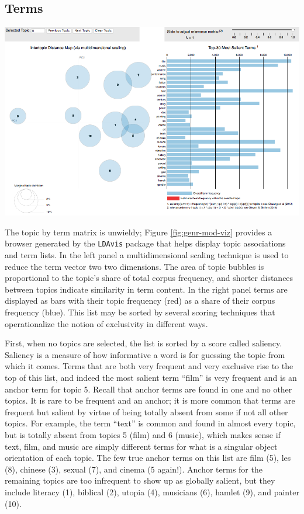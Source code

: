 \documentclass[]{book}
\theoremstyle{definition}
\theoremstyle{definition}
\theoremstyle{definition}
\theoremstyle{remark}
\begin{document}
\hypertarget{terms}{%
\subsection{Terms}\label{terms}}

\begin{center}\includegraphics[width=0.9\linewidth]{img/genr-mod-viz} \end{center}

The topic by term matrix is unwieldy; Figure \ref{fig:genr-mod-viz}
provides a browser generated by the \texttt{LDAvis} package that helps
display topic associations and term lists. In the left panel a
multidimensional scaling technique is used to reduce the term vector two
two dimensions. The area of topic bubbles is proportional to the topic's
share of total corpus frequency, and shorter distances between topics
indicate similarity in term content. In the right panel terms are
displayed as bars with their topic frequency (red) as a share of their
corpus frequency (blue). This list may be sorted by several scoring
techniques that operationalize the notion of exclusivity in different
ways.

First, when no topics are selected, the list is sorted by a score called
saliency. Saliency is a measure of how informative a word is for
guessing the topic from which it comes. Terms that are both very
frequent and very exclusive rise to the top of this list, and indeed the
most salient term ``film'' is very frequent and is an anchor term for
topic 5. Recall that anchor terms are found in one and no other topics.
It is rare to be frequent and an anchor; it is more common that terms
are frequent but salient by virtue of being totally absent from some if
not all other topics. For example, the term ``text'' is common and found
in almost every topic, but is totally absent from topics 5 (film) and 6
(music), which makes sense if text, film, and music are simply different
terms for what is a singular object orientation of each topic. The few
true anchor terms on this list are film (5), les (8), chinese (3),
sexual (7), and cinema (5 again!). Anchor terms for the remaining topics
are too infrequent to show up as globally salient, but they include
literacy (1), biblical (2), utopia (4), musicians (6), hamlet (9), and
painter (10).
\end{document}
